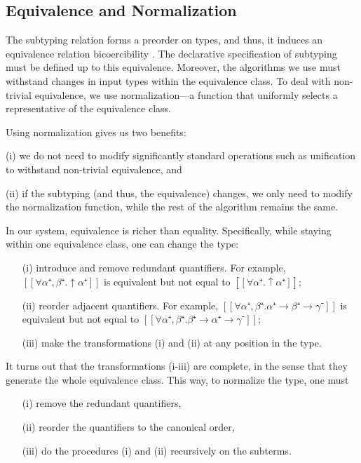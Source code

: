 \subsection{Equivalence and Normalization}
\label{sec:decl-equivalence}

The subtyping relation forms a preorder on types,
and thus, it induces an equivalence relation \aka bicoercibility 
\cite{tiuryn1995:bicoercibility}.
The declarative specification of subtyping must be defined up to this equivalence.
Moreover, the algorithms we use must withstand changes in input types within the equivalence class.
To deal with non-trivial equivalence, 
we use normalization---a function that uniformly selects a representative of the equivalence class.

Using normalization gives us two benefits:
\begin{enumerate*}
  \item [(i)] we do not need to modify significantly standard operations such as unification to withstand non-trivial equivalence, and
  \item [(ii)] if the subtyping (and thus, the equivalence) changes, we only need to modify the normalization function, 
    while the rest of the algorithm remains the same.
\end{enumerate*}

In our system, equivalence is richer than equality. Specifically,
while staying within one equivalence class, one can 
change the type:
\begin{enumerate}
  \item[(i)] introduce and remove redundant quantifiers. For example, $[[∀α⁺,β⁺.↑α⁺]]$ is equivalent
  but not equal to $[[∀α⁺.↑α⁺]]$;
  \item[(ii)] reorder adjacent quantifiers. For example, $[[∀α⁺,β⁺.α⁺ → β⁺ → γ⁻]]$ is equivalent but not equal to
  $[[∀α⁺,β⁺.β⁺ → α⁺ → γ⁻]]$; 
  \item[(iii)] make the transformations (i) and (ii) at any position in the type.
\end{enumerate}

It turns out that the transformations (i-iii) are complete, 
in the sense that they generate the whole equivalence class.
This way, to normalize the type, one must
\begin{enumerate}
  \item [(i)] remove the redundant quantifiers,
  \item [(ii)] reorder the quantifiers to the canonical order,
  \item [(iii)] do the procedures (i) and (ii) recursively on the subterms.
\end{enumerate}

